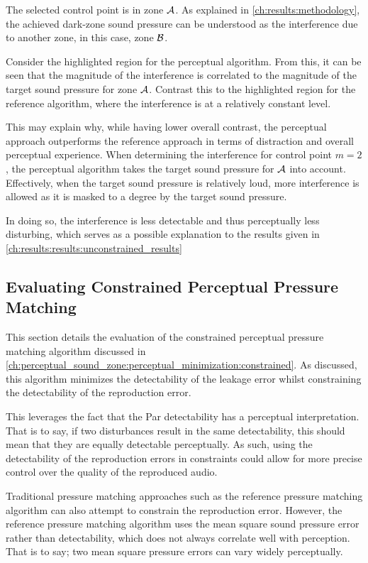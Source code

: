 The selected control point is in zone $\mathcal{A}$. 
As explained in \autoref{ch:results:methodology}, the achieved dark-zone sound pressure can be understood 
as the interference due to another zone, in this case, zone $\mathcal{B}$.

Consider the highlighted region for the perceptual algorithm.
From this, it can be seen that the magnitude of the interference is correlated to the magnitude of the target sound pressure for zone $\mathcal{A}$.
Contrast this to the highlighted region for the reference algorithm, where the interference is at a relatively constant level.

This may explain why, while having lower overall contrast, the perceptual approach outperforms the 
reference approach in terms of distraction and overall perceptual experience.
When determining the interference for control point $m=2$, the perceptual algorithm takes the 
target sound pressure for $\mathcal{A}$ into account. 
Effectively, when the target sound pressure is relatively loud, more interference is allowed 
as it is masked to a degree by the target sound pressure.

In doing so, the interference is less detectable and thus perceptually less disturbing, 
which serves as a possible explanation to the results given in \autoref{ch:results:results:unconstrained_results}

\subsection{Evaluating Constrained Perceptual Pressure Matching}
\label{ch:results:results:constrained_results}
This section details the evaluation of the constrained perceptual pressure matching algorithm discussed in 
\autoref{ch:perceptual_sound_zone:perceptual_minimization:constrained}.
As discussed, this algorithm minimizes the detectability of the leakage error whilst constraining the detectability of the 
reproduction error.

This leverages the fact that the Par detectability has a perceptual interpretation.
That is to say, if two disturbances result in the same detectability, this should mean that they are equally detectable perceptually.
As such, using the detectability of the reproduction errors in constraints could allow for more precise control over the 
quality of the reproduced audio.

Traditional pressure matching approaches such as the reference pressure matching algorithm can also attempt to constrain the 
reproduction error.
However, the reference pressure matching algorithm uses the mean square sound pressure error rather than detectability,
which does not always correlate well with perception.
That is to say; two mean square pressure errors can vary widely perceptually.


